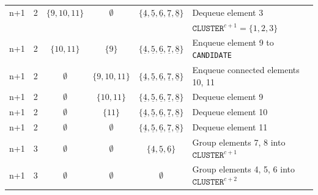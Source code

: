 \begin{table}[htbp!]
\begin{tabular}{r c c c c | l}
    n+1  & 2     & $\{9,10,11\}$       & $\emptyset$        & $\{\underline{4},\underline{5},\underline{6},\underline{7},\underline{8}\}$ & Dequeue element 3                                                                                              \\
         &       &                     &                    &                                                                             & $\texttt{CLUSTER}^{c+1} = \{1,2,3\}$                                                                           \\
    n+1  & 2     & $\{10,11\}$         & $\{9\}$            & $\{\underline{4},\underline{5},\underline{6},\underline{7},\underline{8}\}$ & Enqueue element 9 to \texttt{CANDIDATE}                                                                        \\
    n+1  & 2     & $\emptyset$         & $\{9,10,11\}$      & $\{\underline{4},\underline{5},\underline{6},\underline{7},\underline{8}\}$ & Enqueue connected elements 10, 11                                                                              \\
    n+1  & 2     & $\emptyset$         & $\{10,11\}$        & $\{\underline{4},\underline{5},\underline{6},\underline{7},\underline{8}\}$ & Dequeue element 9                                                                                              \\
    n+1  & 2     & $\emptyset$         & $\{11\}$           & $\{\underline{4},\underline{5},\underline{6},\underline{7},\underline{8}\}$ & Dequeue element 10                                                                                             \\
    n+1  & 2     & $\emptyset$         & $\emptyset$        & $\{\underline{4},\underline{5},\underline{6},\underline{7},\underline{8}\}$ & Dequeue element 11                                                                                             \\
    n+1  & 3     & $\emptyset$         & $\emptyset$        & $\{\underline{4},\underline{5},\underline{6}\}$                             & Group elements 7, 8 into $\texttt{CLUSTER}^{c+1}$                                                              \\
    n+1  & 3     & $\emptyset$         & $\emptyset$        & $\emptyset$                                                                 & Group elements 4, 5, 6 into $\texttt{CLUSTER}^{c+2}$                                                           \\
    \bottomrule
  \end{tabular}
  \label{tab: flooding demo}
\end{table}

